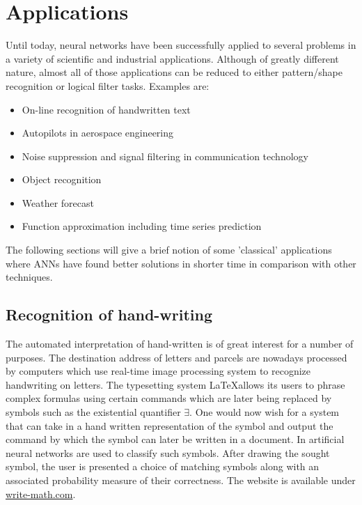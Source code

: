 \documentclass[10pt,a4paper,DIV=11]{scrreprt}
\begin{document}
\section{Applications}
\label{sec:exp}
Until today, neural networks have been successfully applied to several problems in a variety of scientific and industrial applications. Although of greatly different nature, almost all of those applications can be reduced to either pattern/shape recognition or logical filter tasks. Examples are:\\
\begin{itemize}
    \item On-line recognition of handwritten text
    \item Autopilots in aerospace engineering
    \item Noise suppression and signal filtering in communication technology 
    \item Object recognition
    \item Weather forecast
    \item Function approximation including time series prediction
\end{itemize}

The following sections will give a brief notion of some 'classical' applications where ANNs have found better solutions in shorter time in comparison with other techniques.
\subsection{Recognition of hand-writing}
The automated interpretation of hand-written is of great interest for a number of purposes. The destination address of letters and parcels are nowadays processed by computers 
which use real-time image processing system to recognize handwriting on letters. The typesetting system \LaTeX  allows its users to phrase complex formulas using certain commands 
which are later being replaced by symbols such as the existential quantifier $\exists$. 
One would now wish for a system that can take in a hand written representation of the symbol and output the command by which the symbol can later be written in a document. 
In \cite{MARTIN} artificial neural networks are used to classify such symbols. After drawing the sought symbol, the user is presented a choice of matching symbols along with an 
associated probability measure of their correctness. The website is available under \url{write-math.com}.
\\
\end{document}

